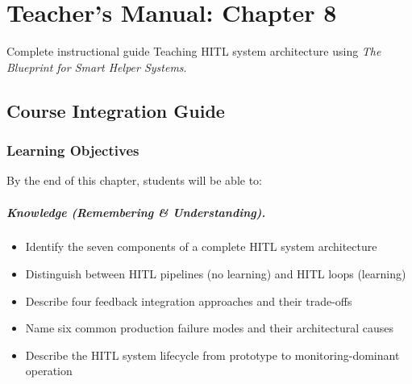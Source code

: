 
\chapter{Teacher's Manual: Chapter 8}
\label{ch:teacher-ch08}

\begin{chapterquote}{Complete instructional guide}
Teaching HITL system architecture using \emph{The Blueprint for Smart Helper Systems}.
\end{chapterquote}

\section{Course Integration Guide}

\subsection{Learning Objectives}

By the end of this chapter, students will be able to:

\paragraph{Knowledge (Remembering \& Understanding).}
\begin{itemize}
    \item Identify the seven components of a complete HITL system architecture
    \item Distinguish between HITL pipelines (no learning) and HITL loops (learning)
    \item Describe four feedback integration approaches and their trade-offs
    \item Name six common production failure modes and their architectural causes
    \item Describe the HITL system lifecycle from prototype to monitoring-dominant operation
\end{itemize}

